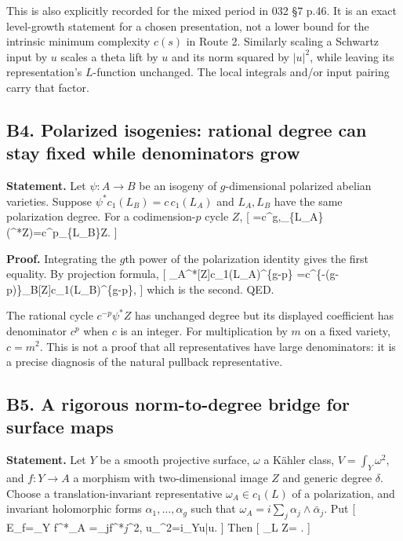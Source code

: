 \documentclass[11pt,a4paper]{article}
\theoremstyle{definition}
\begin{document}
This is also explicitly recorded for the mixed period in 032 §7 p.46. It
is an exact level-growth statement for a chosen presentation, not a
lower bound for the intrinsic minimum complexity \(c(s)\) in Route 2.
Similarly scaling a Schwartz input by \(u\) scales a theta lift by \(u\)
and its norm squared by \(|u|^2\), while leaving its representation's
\(L\)-function unchanged. The local integrals and/or input pairing carry
that factor.

\subsection{B4. Polarized isogenies: rational degree can stay fixed
while denominators
grow}\label{b4.-polarized-isogenies-rational-degree-can-stay-fixed-while-denominators-grow}

\textbf{Statement.} Let \(\psi:A\to B\) be an isogeny of
\(g\)-dimensional polarized abelian varieties. Suppose
\(\psi^*c_1(L_B)=c\,c_1(L_A)\) and \(L_A,L_B\) have the same
polarization degree. For a codimension-\(p\) cycle \(Z\), {[}
\deg\psi=c\^{}g,\qquad \deg\_\{L\_A\}(\psi\^{}*Z)=c\^{}p\deg\_\{L\_B\}Z.
{]}

\textbf{Proof.} Integrating the \(g\)th power of the polarization
identity gives the first equality. By projection formula, {[}
\int\_A\psi\^{}*{[}Z{]}c\_1(L\_A)\^{}\{g-p\}
=c\^{}\{-(g-p)\}\deg\psi\int\_B{[}Z{]}c\_1(L\_B)\^{}\{g-p\}, {]} which
is the second. QED.

The rational cycle \(c^{-p}\psi^*Z\) has unchanged degree but its
displayed coefficient has denominator \(c^p\) when \(c\) is an integer.
For multiplication by \(m\) on a fixed variety, \(c=m^2\). This is not a
proof that all representatives have large denominators: it is a precise
diagnosis of the natural pullback representative.

\subsection{B5. A rigorous norm-to-degree bridge for surface
maps}\label{b5.-a-rigorous-norm-to-degree-bridge-for-surface-maps}

\textbf{Statement.} Let \(Y\) be a smooth projective surface, \(\omega\)
a Kähler class, \(V=\int_Y\omega^2\), and \(f:Y\to A\) a morphism with
two-dimensional image \(Z\) and generic degree \(\delta\). Choose a
translation-invariant representative \(\omega_A\in c_1(L)\) of a
polarization, and invariant holomorphic forms
\(\alpha_1,\ldots,\alpha_g\) such that
\(\omega_A=i\sum_j\alpha_j\wedge\bar\alpha_j\). Put {[} E\_f=\int\_Y
f\^{}*\omega\_A\wedge\omega
=\sum\_j\textbar f\^{}*\alpha\emph{j\textbar{}}\omega\^{}2,\qquad
\textbar u\textbar\_\omega\^{}2=i\int\_Yu\wedge\bar u\wedge\omega. {]}
Then {[} \deg\_L Z=
\leq{}. {]}
\end{document}
